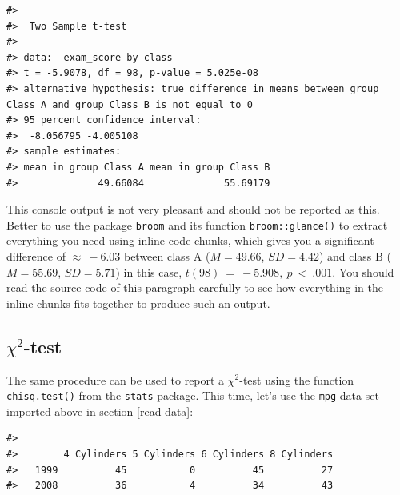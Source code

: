 \documentclass[
  11pt,
  a4paper,
  twoside]{scrbook}
\newenvironment{Shaded}{\begin{snugshade}}{\end{snugshade}}
\newcommand{\CommentTok}[1]{\textcolor[rgb]{0.56,0.35,0.01}{\textit{#1}}}
\newcommand{\FunctionTok}[1]{\textcolor[rgb]{0.00,0.00,0.00}{#1}}
\newcommand{\NormalTok}[1]{#1}
\newcommand{\OtherTok}[1]{\textcolor[rgb]{0.56,0.35,0.01}{#1}}
\newcommand{\SpecialCharTok}[1]{\textcolor[rgb]{0.00,0.00,0.00}{#1}}
\begin{document}
\linespread{1}

\begin{verbatim}
#> 
#>  Two Sample t-test
#> 
#> data:  exam_score by class
#> t = -5.9078, df = 98, p-value = 5.025e-08
#> alternative hypothesis: true difference in means between group Class A and group Class B is not equal to 0
#> 95 percent confidence interval:
#>  -8.056795 -4.005108
#> sample estimates:
#> mean in group Class A mean in group Class B 
#>              49.66084              55.69179
\end{verbatim}

This console output is not very pleasant and should not be reported as this. Better to use the package \texttt{broom} and its function \texttt{broom::glance()} to extract everything you need using inline code chunks, which gives you a significant difference of \(\approx~-6.03\) between class A (\(M = 49.66\), \(SD = 4.42\)) and class B (\(M = 55.69\), \(SD = 5.71\)) in this case, \(t(98)~=~-5.908,~p~<~.001\). You should read the source code of this paragraph carefully to see how everything in the inline chunks fits together to produce such an output.

\hypertarget{chi2-test}{%
\subsection{\texorpdfstring{\(\chi^2\)-test}{\textbackslash chi\^{}2-test}}\label{chi2-test}}

The same procedure can be used to report a \(\chi^2\)-test using the function \texttt{chisq.test()} from the \texttt{stats} package. This time, let's use the \texttt{mpg} data set imported above in section \ref{read-data}:

\linespread{1}

\begin{Shaded}
\end{Shaded}

\linespread{1}

\begin{verbatim}
#>       
#>        4 Cylinders 5 Cylinders 6 Cylinders 8 Cylinders
#>   1999          45           0          45          27
#>   2008          36           4          34          43
\end{verbatim}
\end{document}
